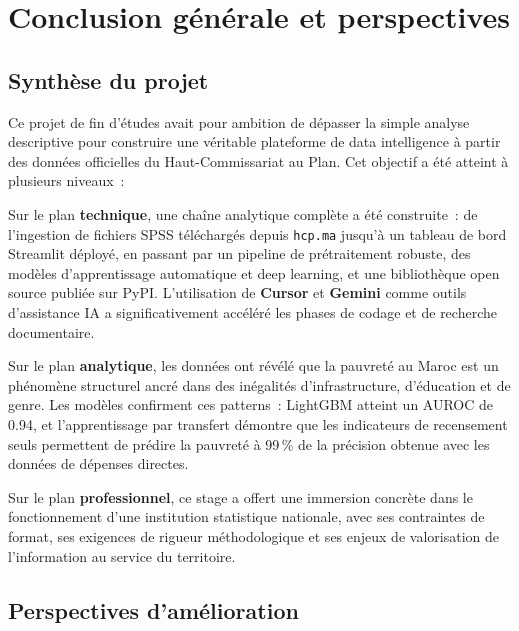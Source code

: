 \documentclass[12pt,a4paper]{report}
\begin{document}
\chapter*{Conclusion générale et perspectives}

\section*{Synthèse du projet}

Ce projet de fin d'études avait pour ambition de dépasser la simple analyse descriptive pour construire une véritable plateforme de data intelligence à partir des données officielles du Haut-Commissariat au Plan. Cet objectif a été atteint à plusieurs niveaux~:

Sur le plan \textbf{technique}, une chaîne analytique complète a été construite~: de l'ingestion de fichiers SPSS téléchargés depuis \texttt{hcp.ma} jusqu'à un tableau de bord Streamlit déployé, en passant par un pipeline de prétraitement robuste, des modèles d'apprentissage automatique et deep learning, et une bibliothèque open source publiée sur PyPI. L'utilisation de \textbf{Cursor} et \textbf{Gemini} comme outils d'assistance IA a significativement accéléré les phases de codage et de recherche documentaire.

Sur le plan \textbf{analytique}, les données ont révélé que la pauvreté au Maroc est un phénomène structurel ancré dans des inégalités d'infrastructure, d'éducation et de genre. Les modèles confirment ces patterns~: LightGBM atteint un AUROC de 0.94, et l'apprentissage par transfert démontre que les indicateurs de recensement seuls permettent de prédire la pauvreté à 99\,\% de la précision obtenue avec les données de dépenses directes.

Sur le plan \textbf{professionnel}, ce stage a offert une immersion concrète dans le fonctionnement d'une institution statistique nationale, avec ses contraintes de format, ses exigences de rigueur méthodologique et ses enjeux de valorisation de l'information au service du territoire.

\section*{Perspectives d'amélioration}
\end{document}
